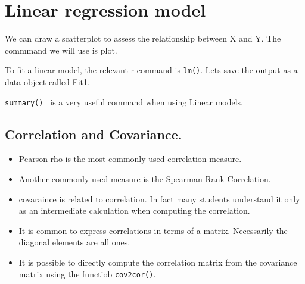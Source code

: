 \section{Linear regression model}

We can draw a scatterplot to assess the relationship between X and Y.
The commmand we will use is plot.

To fit a linear model, the relevant r command is \texttt{lm()}.
Lets save the output as a data object called Fit1.

\texttt{summary() } 
is a very useful command when using Linear models.

\subsection{Correlation and Covariance.}

\begin{itemize}
\item Pearson rho is the most commonly used correlation measure.
\item 
Another commonly used measure is the Spearman Rank Correlation. 
\item 
covaraince is related to correlation. In fact many students understand it only as an intermediate calculation when computing the correlation.
\item 
It is common to express correlations in terms of a matrix. Necessarily the diagonal elements are all ones.
\item 
It is possible to directly compute the correlation matrix from the covariance matrix using the functiob \texttt{cov2cor()}.
\end{itemize}
